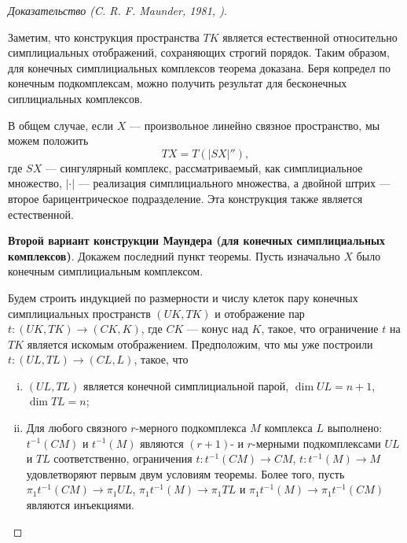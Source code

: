 \documentclass[14pt, dvipsnames, twoside]{extarticle}
\theoremstyle{definition}
\theoremstyle{remark}
\begin{document}
\begin{proof}[Доказательство {\normalfont (C. R. F. Maunder, 1981, \cite{Maunder})}]
\begin{enumerate}[\bf 1.]
\end{enumerate}

Заметим, что конструкция пространства $TK$ является естественной относительно симплициальных отображений, сохраняющих строгий порядок. Таким образом, для конечных симплициальных комплексов теорема доказана. Беря копредел по конечным подкомплексам, можно получить результат для бесконечных сиплициальных комплексов.

В общем случае, если $X$ --- произвольное линейно связное пространство, мы можем положить $$TX=T(|SX|''),$$ где $SX$ --- сингулярный комплекс, рассматриваемый, как симплициальное множество, $|\cdot|$ --- реализация симплициального множества, а двойной штрих --- второе барицентрическое подразделение. Эта конструкция также является естественной.

{\bf Второй вариант конструкции Маундера (для конечных симплициальных комплексов)}. Докажем последний пункт теоремы. Пусть изначально $X$ было конечным симплициальным комплексом. 

Будем строить индукцией по размерности и числу клеток пару конечных симплициальных пространств $(UK, TK)$ и отображение пар $t: (UK, TK) \to (CK, K)$, где $CK$ --- конус над $K$, такое, что ограничение $t$ на $TK$ является искомым отображением. Предположим, что мы уже построили $t: (UL, TL) \to (CL, L)$, такое, что 

\begin{enumerate}[(i)]

\item $(UL, TL)$ является конечной симплициальной парой, $\dim UL = n+1$, $\dim TL = n$;

\item Для любого связного $r$-мерного подкомплекса $M$ комплекса $L$ выполнено: $t^{-1}(CM)$ и $t^{-1}(M)$ являются $(r+1)$- и $r$-мерными подкомплексами $UL$ и  $TL$ соответственно, ограничения $t: t^{-1}(CM)\to CM$, $t: t^{-1}(M)\to M$ удовлетворяют первым двум условиям теоремы. Более того, пусть $\pi_1t^{-1}(CM)\to \pi_1UL$, $\pi_1t^{-1}(M)\to \pi_1TL$ и $\pi_1t^{-1}(M)\to\pi_1t^{-1}(CM)$ являются инъекциями. 

\end{enumerate}    



\end{proof}
\end{document}
